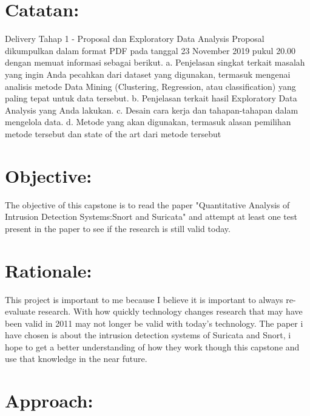 \documentclass{article}
\begin{document}
    \begin{normalsize}
    
        \section{Catatan:}
        
        Delivery Tahap 1 - Proposal dan Exploratory Data Analysis
        Proposal dikumpulkan dalam format PDF pada tanggal 23 November 2019 pukul 20.00
        dengan memuat informasi sebagai berikut.
        a. Penjelasan singkat terkait masalah yang ingin Anda pecahkan dari dataset yang
        digunakan, termasuk mengenai analisis metode Data Mining (Clustering,
        Regression, atau classification) yang paling tepat untuk data tersebut.
        b. Penjelasan terkait hasil Exploratory Data Analysis yang Anda lakukan.
        c. Desain cara kerja dan tahapan-tahapan dalam mengelola data.
        d. Metode yang akan digunakan, termasuk alasan pemilihan metode tersebut dan
        state of the art dari metode tersebut
        
        \section{Objective:}
        
        The objective of this capstone is to read the paper "Quantitative Analysis of Intrusion Detection Systems:Snort and Suricata" and attempt at least one test present in the paper to see if the research is still valid today.    \\
      
		\section{Rationale:}
        
       This project is important to me because I believe it is important to always re-evaluate research. With how quickly technology changes research that may have been valid  in 2011 may not longer be valid with today's technology.  The paper i have chosen is about the intrusion detection systems of Suricata and Snort, i hope to get a better understanding of how they work though this capstone and use that knowledge in the near future.
        
	   	\section{Approach:}
        

\end{normalsize}
\end{document}
